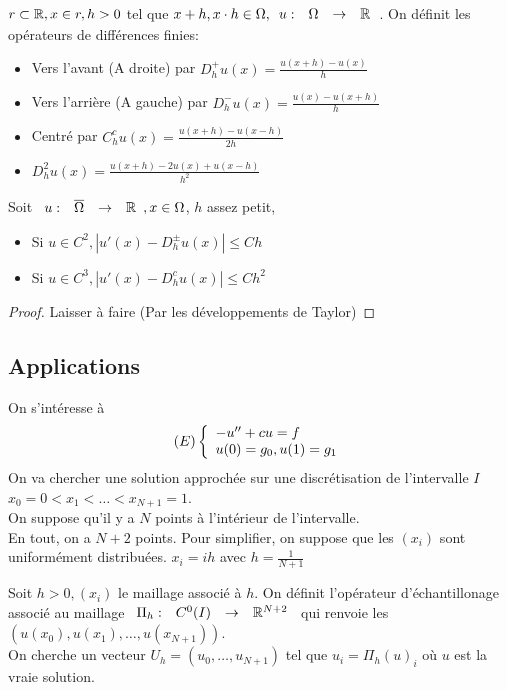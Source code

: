 \documentclass[]{report}
\begin{document}
    \begin{df}{}{}
        $r\subset \mathbb{R},x\in r,h>0$ tel que $x+h,x\cdot h\in \Omega,\begin{array}{ccccc} u : & \Omega & \to & \mathbb{R} \end{array}$. On définit les opérateurs de différences finies:
        \begin{itemize}
            \item Vers l'avant (A droite) par $D_h^+ u(x)=\frac{u(x+h)-u(x)}{h}$
            \item Vers l'arrière (A gauche) par $D_h^- u(x)=\frac{u(x)-u(x+h)}{h}$
            \item Centré par $C_h^c u(x)=\frac{u(x+h)-u(x-h)}{2h}$
            \item $D_h^2 u(x)=\frac{u(x+h)-2u(x)+u(x-h)}{h^2}$
        \end{itemize}
    \end{df}

    \begin{prop}{}{}
        Soit $\begin{array}{ccccc} u : & \overline{\Omega} & \to & \mathbb{R} \end{array},x\in \Omega$, $h$ assez petit,
        \begin{itemize}
            \item Si $u\in C^2,|u'(x)-D_h^{\pm} u(x)|\le Ch$
            \item Si $u\in C^3, |u'(x)-D_h^c u(x)|\le Ch^2$
        \end{itemize}
    \end{prop}

    \begin{proof}
        Laisser à faire (Par les développements de Taylor)
    \end{proof}

    \subsection{Applications}
    
    On s'intéresse à
    \[(E)\left\{\begin{array}{ll} -u''+cu=f\\u(0)=g_0,u(1)=g_1 \end{array} \right.\]
    On va chercher une solution approchée sur une discrétisation de l'intervalle $I$ $x_0=0<x_1<\ldots<x_{N+1}=1$.\\
    On suppose qu'il y a $N$ points à l'intérieur de l'intervalle.\\
    En tout, on a $N+2$ points.
    Pour simplifier, on suppose que les $(x_i)$ sont uniformément distribuées. $x_i=ih$ avec $h=\frac{1}{N+1}$

    \begin{df}{}{}
        Soit $h>0,(x_i)$ le maillage associé à $h$. On définit l'opérateur d'échantillonage associé au maillage $\begin{array}{ccccc} \Pi_h : & C^0(I) & \to & \mathbb{R}^{N+2} \end{array}$ qui renvoie les $(u(x_0),u(x_1),\ldots,u(x_{N+1}))$.\\
        On cherche un vecteur $U_h=(u_0,\ldots,u_{N+1})$ tel que $u_i=\Pi_h(u)_i$ où $u$ est la vraie solution.
    \end{df}
\end{document}
